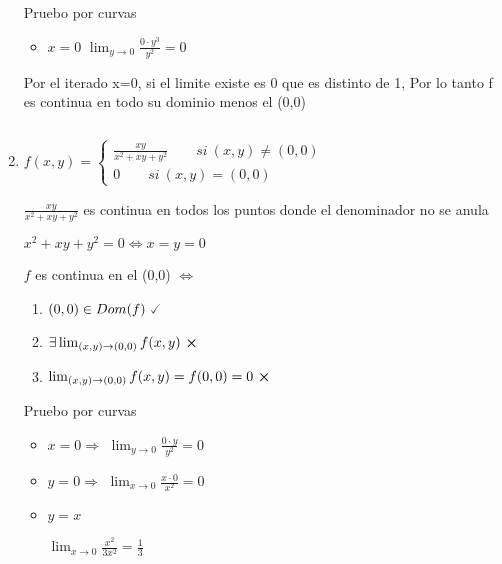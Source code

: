 \documentclass[../practica_03.tex]{subfiles}
\begin{document}
\begin{enumerate}
            Pruebo por curvas

            \begin{itemize}
                \item $x = 0$
                    $\lim_{y\to 0} \frac{0\cdot y^3}{y^2} = 0$
            \end{itemize}

            Por el iterado x=0, si el limite existe es 0 que es distinto de 1,
            Por lo tanto f es continua en todo su dominio menos el (0,0)

            $ $

        \item $f(x,y) = \left\{
            \begin{array}{ll}
                \frac{xy}{x^2 + xy +y^2} \qquad si\ (x,y)\neq(0,0)\\
                0 \qquad si\ (x,y) = (0,0)
            \end{array}
        \right.$

            $\frac{xy}{x^2 + xy +y^2}$ es continua en todos los puntos donde el denominador no se anula

            $ x^2 + xy +y^2 = 0 \Leftrightarrow x = y = 0 $

            $f$ es continua en el (0,0) $\Leftrightarrow$

            \begin{enumerate}
                \item $(0,0) \in Dom(f)\ \checked$
                \item $\exists \lim_{(x,y)\to (0,0)} f(x,y)\ \crossproduct$
                \item $\lim_{(x,y)\to (0,0)} f(x,y) = f(0,0) = 0\ \crossproduct $
            \end{enumerate}

            Pruebo por curvas

            \begin{itemize} %
                \item $x = 0 \Rightarrow$
                    $\lim_{y\to 0} \frac{0\cdot y}{y^2} = 0$
                \item $y = 0 \Rightarrow$
                    $\lim_{x\to 0} \frac{x\cdot 0}{x^2} = 0$
                \item $y = x$

                    $\lim_{x\to 0} \frac{x^2}{3x^2} = \frac{1}{3}$
            \end{itemize}


\end{enumerate}
\end{document}
